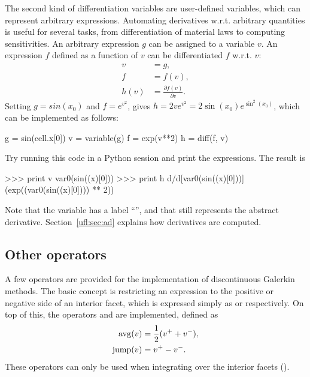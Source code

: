 The second kind of differentiation variables are user-defined
variables, which can represent arbitrary expressions.  Automating
derivatives w.r.t. arbitrary quantities is useful for several tasks,
from differentiation of material laws to computing sensitivities.  An
arbitrary expression $g$ can be assigned to a variable $v$.  An
expression $f$ defined as a function of $v$ can be differentiated $f$
w.r.t. $v$:
\begin{align}
v &= g, \\
f &= f(v), \\
h(v) &= \frac{\partial f(v)}{\partial v}.
\end{align}
Setting $g = sin(x_0)$ and $f = e^{v^2}$, gives $h = 2 v e^{v^2} = 2
\sin(x_0) e^{\sin^2(x_0)}$, which can be implemented as follows:
\begin{python}
g = sin(cell.x[0])
v = variable(g)
f = exp(v**2)
h = diff(f, v)
\end{python}
Try running this code in a Python session and print the expressions.
The result is
\begin{python}
>>> print v
var0(sin((x)[0]))
>>> print h
d/d[var0(sin((x)[0]))] (exp((var0(sin((x)[0]))) ** 2))
\end{python}
Note that the variable has a label ``'', and that 
still represents the abstract derivative.  Section~\ref{ufl:sec:ad}
explains how derivatives are computed.

\subsection{Other operators}
\label{ufl:sec:conditionals}

A few operators are provided for the implementation of discontinuous
Galerkin methods.  The basic concept is restricting an expression to
the positive or negative side of an interior facet, which is expressed
simply as  or  respectively. On top of
this, the operators  and  are implemented,
defined as
\begin{align}
\operatorname{avg}(v)  &= \frac 1 2 (v^+ + v^-), \\
\operatorname{jump}(v) &= v^+ - v^- .
\end{align}
These operators can only be used when integrating over the interior
facets ().

